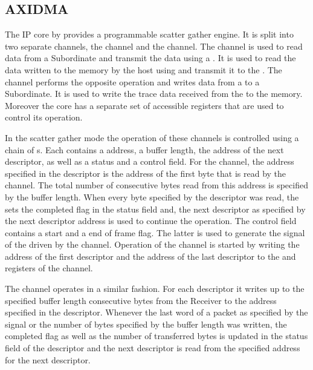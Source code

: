 \subsection{AXIDMA}\label{sec:AXIDMA}
The \AXIDMA{} IP core by \Xilinx{}\autocite{ref:axidma} provides a programmable scatter gather \DMA{} engine. It is split into two separate channels, the \MMToS{} channel and the \SToMM{} channel.
The \MMToS{} channel is used to read data from a \AXI{} Subordinate and transmit the data using a \AXIStream{}. It is used to read the data written to the \DDR{} memory by the host using \FAXI{} and transmit it to the \pbexec{}. The \SToMM{} channel performs the opposite operation and writes data from a \AXIStream{} to a \AXI{} Subordinate. It is used to write the trace data received from the \pbexec{} to the \DDR{} memory.
Moreover the \AXIDMA{} core has a separate set of \AXILite{} accessible registers that are used to control its operation.

In the scatter gather mode the operation of these channels is controlled using a chain of \descriptor{}s.
Each \descriptor{} contains a address, a buffer length, the address of the next descriptor, as well as a status and a control field. For the \MMToS{} channel, the address specified in the descriptor is the address of the first byte that is read by the channel. The total number of consecutive bytes read from this address is specified by the buffer length. When every byte specified by the descriptor was read, the \AXIDMA{} sets the completed flag in the status field and, the next descriptor as specified by the next descriptor address is used to continue the operation. The control field contains a start and a end of frame flag. The latter is used to generate the \TLAST{} signal of the \AXIStream{} driven by the \MMToS{} channel. Operation of the \MMToS{} channel is started by writing the address of the first descriptor and the address of the last descriptor to the \curdesc{} and \taildesc{} registers of the \MMToS{} channel.

The \SToMM{} channel operates in a similar fashion. For each descriptor it writes up to the specified buffer length consecutive bytes from the \SToMM{} \AXIStream{} Receiver to the address specified in the descriptor.
Whenever the last word of a packet as specified by the \TLAST{} signal or the number of bytes specified by the buffer length was written, the completed flag as well as the number of transferred bytes is updated in the status field of the descriptor and the next descriptor is read from the specified address for the next descriptor.

